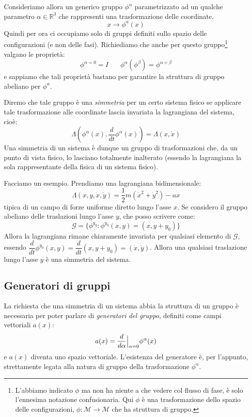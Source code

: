 \documentclass[a4paper,openany]{article}
\begin{document}
	Consideriamo allora un generico gruppo $\phi^{\alpha}$ parametrizzato ad un qualche parametro $\alpha\in\mathbb{R}^{3}$ che rappresenti una trasformazione delle coordinate.
	$$
	x \longrightarrow \phi^{\alpha}(x)
	$$ 
	Quindi per ora ci occupiamo solo di gruppi definiti sullo spazio delle configurazioni (e non delle fasi).
	Richiediamo che anche per questo gruppo\footnote{L'abbiamo indicato $\phi$ ma non ha niente a che vedere col flusso di fase, è solo l'ennesima notazione confusionaria. Qui $\phi$ è una trasformazione dello spazio delle configurazioni, $\phi : \mathcal{M}\to\mathcal{M}$ che ha struttura di gruppo.} valgano le proprietà:
	$$
	\phi^{\alpha = 0} = I \>\>\>\>\>\>\>\> \phi^{\alpha}(\phi^{\beta}) = \phi^{\alpha+\beta}
	$$
	e sappiamo che tali proprietà bastano per garantire la struttura di gruppo abeliano per $\phi^{\alpha}$. 
	
	Diremo che tale gruppo è una \textit{simmetria} per un certo sistema fisico se applicare tale trasformazione alle coordinate lascia invariata la lagrangiana del sistema, cioè:
	\begin{equation}
		\Lambda(\phi^{\alpha}(x),\dfrac{d}{dt}\phi^{\alpha}(x)) = \Lambda(x,\dot{x})
	\end{equation}
	Una simmetria di un sistema è dunque un gruppo di trasformazioni che, da un punto di vista fisico, lo lasciano totalmente inalterato (essendo la lagrangiana la sola rappresentante della fisica di un sistema fisico). 
	
	Facciamo un esempio. Prendiamo una lagrangiana bidimensionale:
	$$
	\Lambda(x,y,\dot{x},\dot{y}) = \dfrac{1}{2}m(\dot{x}^2+\dot{y}^2) - ax
	$$
	tipica di un campo di forze uniforme diretto lungo l'asse $x$. Se considero il gruppo abeliano delle traslazioni lungo l'asse $y$, che posso scrivere come:
	\begin{equation}
		\mathcal{G} = \{\phi^{y_0}: \phi^{y_0}(x,y) = (x,y+y_0)\}
	\end{equation}
	Allora la lagrangiana rimane chiaramente invariata per qualsiasi elemento di $\mathcal{G}$, essendo $\dfrac{d}{dt}\phi^{y_0}(x,y) = \dfrac{d}{dt}(x,y+y_0) = (\dot{x},\dot{y})$. Allora una qualsiasi traslazione lungo l'asse $y$ è una simmetria del sistema.
	\subsection{Generatori di gruppi}
	La richiesta che una simmetria di un sistema abbia la struttura di un gruppo è necessaria per poter parlare di \textit{generatori del gruppo}, definiti come campi vettoriali $a(x)$:
	\begin{equation}
		a(x) = \dfrac{d}{d\alpha}\Bigl|_{\alpha=0}\phi^{\alpha}(x)
	\end{equation}
	e $a(x)$ diventa uno spazio vettoriale. L'esistenza del generatore è, per l'appunto, strettamente legata alla natura di gruppo della trasformazione $\phi^{\alpha}$.
	
\end{document}
